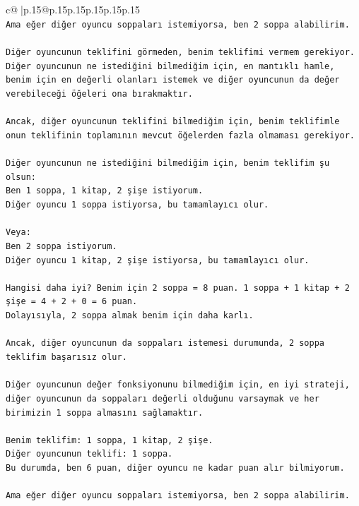 \documentclass{article}
\begin{document}
{\begin{supertabular}{c@{$\;$}|p{.15\linewidth}@{}p{.15\linewidth}p{.15\linewidth}p{.15\linewidth}p{.15\linewidth}p{.15\linewidth}}
{{{\\ 
\texttt{Ama eğer diğer oyuncu soppaları istemiyorsa, ben 2 soppa alabilirim.} \\
\\ 
\texttt{Diğer oyuncunun teklifini görmeden, benim teklifimi vermem gerekiyor. Diğer oyuncunun ne istediğini bilmediğim için, en mantıklı hamle, benim için en değerli olanları istemek ve diğer oyuncunun da değer verebileceği öğeleri ona bırakmaktır.} \\
\\ 
\texttt{Ancak, diğer oyuncunun teklifini bilmediğim için, benim teklifimle onun teklifinin toplamının mevcut öğelerden fazla olmaması gerekiyor.} \\
\\ 
\texttt{Diğer oyuncunun ne istediğini bilmediğim için, benim teklifim şu olsun:} \\
\texttt{Ben 1 soppa, 1 kitap, 2 şişe istiyorum.} \\
\texttt{Diğer oyuncu 1 soppa istiyorsa, bu tamamlayıcı olur.} \\
\\ 
\texttt{Veya:} \\
\texttt{Ben 2 soppa istiyorum.} \\
\texttt{Diğer oyuncu 1 kitap, 2 şişe istiyorsa, bu tamamlayıcı olur.} \\
\\ 
\texttt{Hangisi daha iyi? Benim için 2 soppa = 8 puan. 1 soppa + 1 kitap + 2 şişe = 4 + 2 + 0 = 6 puan.} \\
\texttt{Dolayısıyla, 2 soppa almak benim için daha karlı.} \\
\\ 
\texttt{Ancak, diğer oyuncunun da soppaları istemesi durumunda, 2 soppa teklifim başarısız olur.} \\
\\ 
\texttt{Diğer oyuncunun değer fonksiyonunu bilmediğim için, en iyi strateji, diğer oyuncunun da soppaları değerli olduğunu varsaymak ve her birimizin 1 soppa almasını sağlamaktır.} \\
\\ 
\texttt{Benim teklifim: 1 soppa, 1 kitap, 2 şişe.} \\
\texttt{Diğer oyuncunun teklifi: 1 soppa.} \\
\texttt{Bu durumda, ben 6 puan, diğer oyuncu ne kadar puan alır bilmiyorum.} \\
\\ 
\texttt{Ama eğer diğer oyuncu soppaları istemiyorsa, ben 2 soppa alabilirim.} \\
}}}
\end{supertabular}}
\end{document}
